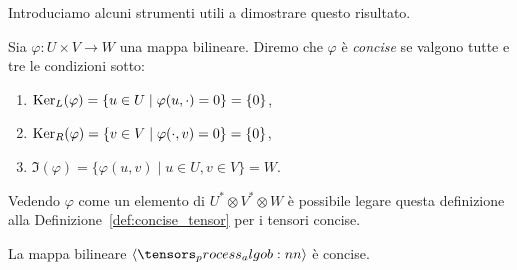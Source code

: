 Introduciamo alcuni strumenti utili a dimostrare questo risultato.
\begin{definition}
	Sia $ \varphi : U\times V \to  W$ una mappa bilineare. Diremo che $ \varphi $ è \emph{concise} se
	valgono tutte e tre le condizioni sotto:
	\begin{enumerate}[label=(\roman*)]
		\item $\operatorname{Ker}_L(\varphi) = \{u \in U \mid \varphi(u,\cdot ) = 0\}  = \{0\} $,
		\item $\operatorname{Ker}_R(\varphi) = \{v \in V \mid \varphi(\cdot,v ) = 0\}  = \{0\} $,
		\item $\Im(\varphi) = \{\varphi(u,v) \mid u\in U, v\in V\} = W$.
	\end{enumerate}
\end{definition}
\begin{remark}
	Vedendo $ \varphi $ come un elemento di $ U^* \otimes V^* \otimes W $ è possibile legare questa
	definizione alla Definizione~\ref{def:concise_tensor} per i tensori concise.
\end{remark}
\begin{example}
	La mappa bilineare $ \algob{n} $ è concise.
\end{example}

